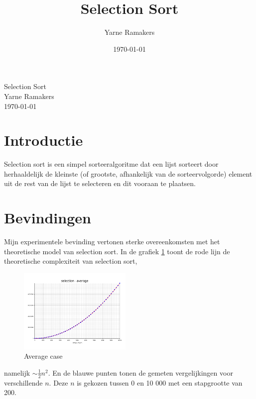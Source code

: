 \documentclass[a4paper]{article}
\title{Selection Sort}
\author{Yarne Ramakers}
\date{\today}
\begin{document}
\begin{center}
  Selection Sort \\
  Yarne Ramakers \\
  \today \\
\end{center}

\section{Introductie}

Selection sort is een simpel sorteeralgoritme dat een lijst sorteert door herhaaldelijk de kleinste (of grootste, afhankelijk van de sorteervolgorde) element uit de rest van de lijst te selecteren en dit vooraan te plaatsen.

\section{Bevindingen}
Mijn experimentele bevinding vertonen sterke overeenkomsten met het theoretische model van selection sort.
In de grafiek \ref{fig:selection-avg} toont de rode lijn de theoretische complexiteit van selection sort,
\begin{figure}
  \begin{center}
    \includegraphics[width=0.48\textwidth]{../plots/selection-average.png}
    \caption{Average case}
    \label{fig:selection-avg}
  \end{center}
\end{figure}
namelijk $\sim \frac{1}{2} n^2$. 
En de blauwe punten tonen de gemeten vergelijkingen voor verschillende $n$. 
Deze $n$ is gekozen tussen 0 en 10 000 met een stapgrootte van 200.
\end{document}
